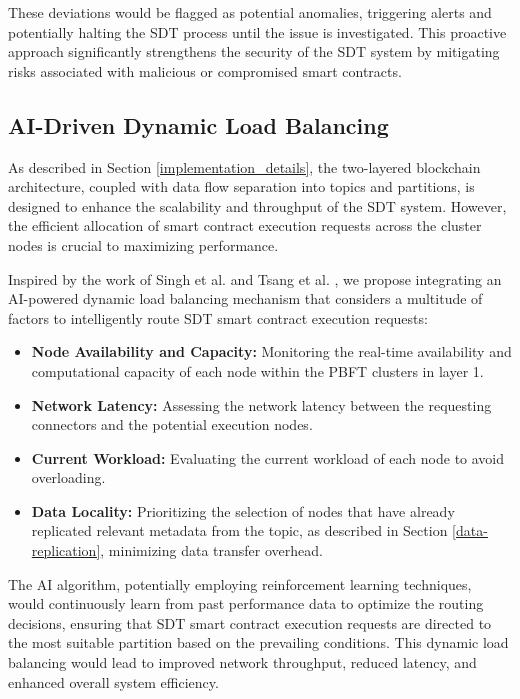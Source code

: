 \documentclass[10pt]{llncs}
\begin{document}
These deviations would be flagged as potential anomalies, triggering alerts and potentially halting the SDT process until the issue is investigated. 
This proactive approach significantly strengthens the security of the SDT system by mitigating risks associated with malicious or compromised smart contracts.

\subsection{AI-Driven Dynamic Load Balancing}

As described in Section \ref{implementation_details}, the two-layered blockchain architecture, coupled with data flow separation into topics and partitions, is designed to enhance the scalability and throughput of the SDT system. 
However, the efficient allocation of smart contract execution requests across the cluster nodes is crucial to maximizing performance.

Inspired by the work of Singh et al. \cite{Singh2024} and Tsang et al. \cite{Tsang2024}, we propose integrating an AI-powered dynamic load balancing mechanism that considers a multitude of factors to intelligently route SDT smart contract execution requests:

\begin{itemize}
    \item \textbf{Node Availability and Capacity:} Monitoring the real-time availability and computational capacity of each node within the PBFT clusters in layer 1.
    \item \textbf{Network Latency:} Assessing the network latency between the requesting connectors and the potential execution nodes.
    \item \textbf{Current Workload:} Evaluating the current workload of each node to avoid overloading.
    \item \textbf{Data Locality:} Prioritizing the selection of nodes that have already replicated relevant metadata from the topic, as described in Section \ref{data-replication}, minimizing data transfer overhead.
\end{itemize}

The AI algorithm, potentially employing reinforcement learning techniques, would continuously learn from past performance data to optimize the routing decisions, ensuring that SDT smart contract execution requests are directed to the most suitable partition based on the prevailing conditions.
 This dynamic load balancing would lead to improved network throughput, reduced latency, and enhanced overall system efficiency.
\end{document}
